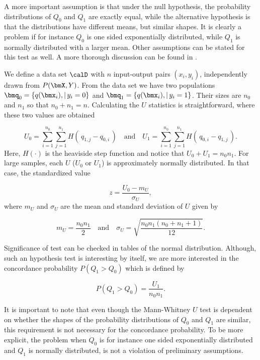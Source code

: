 A more important assumption is that under the null hypothesis, the probability distributions of $Q_0$ and $Q_1$ are exactly equal, while the alternative hypothesis is that the distributions have different means, but similar shapes.  It is clearly a problem if for instance $Q_0$ is one sided exponentially distributed, while $Q_1$ is normally distributed with a larger mean.   
Other assumptions can be stated for this test as well.  A more thorough discussion can be found in \cite{Fay10}.

We define a data set $\calD$ with $n$ input-output pairs $(x_i, y_i)$, independently drawn from $P(\bmX,Y)$.  From the data set we have two populations $\bmq_0 = \{q(\bmx_i) , | \, y_i = 0 \}$ and $\bmq_1 = \{q(\bmx_i) , | \, y_i = 1 \}$.  Their sizes are $n_0$ and $n_1$ so that $n_0 + n_1 = n$.  Calculating the $U$ statistics is straightforward, where these two values are obtained 

\begin{equation}
\label{eq:U}
U_0 = \sum_{i=1}^{n_0}\sum_{j=1}^{n_1} H(\,q_{1,j} - q_{0,i}    \,) \quad \mbox{and} \quad 
U_1 = \sum_{i=1}^{n_0}\sum_{j=1}^{n_1} H( \,q_{0,i} - q_{1,j}    \,).
\end{equation}
Here, $H(\cdot)$ is the heaviside step function and notice that $U_0 + U_1 = n_0n_1$.  For large samples, each $U$ ($U_0$ or $U_1$) is approximately normally distributed. In that case, the standardized value

\begin{equation}
\label{eq:z}
z = \frac{U_0 - m_{U}}{\sigma_{U}},
\end{equation}
where $m_U$ and $\sigma_U$ are the mean and standard deviation of $U$ given by

\begin{equation}
\label{eq:z}
m_U = \frac{n_0n_1}{2} \quad \mbox{and} \quad 
\sigma_U = \sqrt{\frac{n_0n_1(n_0 + n_1 + 1)}{12} }.
\end{equation}

Significance of test can be checked in tables of the normal distribution.  Although, such an hypothesis test is interesting by itself, we are more interested in the concordance probability $P(Q_1 > Q_0)$ which is defined by

\begin{equation} 
\label{eq:concordance}
P(Q_1 > Q_0) = \frac{U_1}{n_0n_1}.
\end{equation}

It is important to note that even though the Mann-Whitney $U$ test is dependent on whether the shapes of the probability distributions of $Q_0$ and $Q_1$ are similar, this requirement is not necessary for the concordance probability.  To be more explicit, the problem when $Q_0$ is for instance one sided exponentially distributed and $Q_1$ is normally distributed, is not a violation of preliminary assumptions.  

